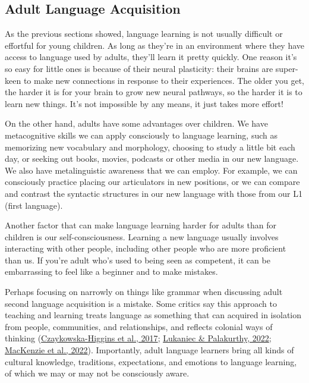\documentclass[
]{krantz}
\begin{document}
\hypertarget{adult-language-acquisition}{%
\subsection*{Adult Language Acquisition}\label{adult-language-acquisition}}


As the previous sections showed, language learning is not usually difficult or effortful for young children. As long as they're in an environment where they have access to language used by adults, they'll learn it pretty quickly. One reason it's so easy for little ones is because of their neural plasticity: their brains are super-keen to make new connections in response to their experiences. The older you get, the harder it is for your brain to grow new neural pathways, so the harder it is to learn new things. It's not impossible by any means, it just takes more effort!

On the other hand, adults have some advantages over children. We have metacognitive skills we can apply consciously to language learning, such as memorizing new vocabulary and morphology, choosing to study a little bit each day, or seeking out books, movies, podcasts or other media in our new language. We also have metalinguistic awareness that we can employ. For example, we can consciously practice placing our articulators in new positions, or we can compare and contrast the syntactic structures in our new language with those from our L1 (first language).

Another factor that can make language learning harder for adults than for children is our self-consciousness. Learning a new language usually involves interacting with other people, including other people who are more proficient than us. If you're adult who's used to being seen as competent, it can be embarrassing to feel like a beginner and to make mistakes.

Perhaps focusing on narrowly on things like grammar when discussing adult second language acquisition is a mistake. Some critics say this approach to teaching and learning treats language as something that can acquired in isolation from people, communities, and relationships, and reflects colonial ways of thinking (\protect\hyperlink{ref-czaykowska2017}{Czaykowska-Higgins et al., 2017}; \protect\hyperlink{ref-lukaniec2022}{Lukaniec \& Palakurthy, 2022}; \protect\hyperlink{ref-mackenzie2022}{MacKenzie et al., 2022}). Importantly, adult language learners bring all kinds of cultural knowledge, traditions, expectations, and emotions to language learning, of which we may or may not be consciously aware.
\end{document}
